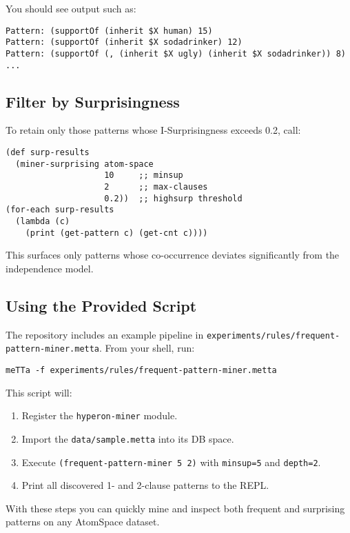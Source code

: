 \documentclass{article}
\begin{document}
You should see output such as:

\begin{verbatim}
Pattern: (supportOf (inherit $X human) 15)
Pattern: (supportOf (inherit $X sodadrinker) 12)
Pattern: (supportOf (, (inherit $X ugly) (inherit $X sodadrinker)) 8)
...
\end{verbatim}

\subsection{Filter by Surprisingness}

To retain only those patterns whose I-Surprisingness exceeds 0.2, call:

\begin{verbatim}
(def surp-results
  (miner-surprising atom-space
                    10     ;; minsup
                    2      ;; max-clauses
                    0.2))  ;; highsurp threshold
(for-each surp-results
  (lambda (c)
    (print (get-pattern c) (get-cnt c))))
\end{verbatim}

This surfaces only patterns whose co-occurrence deviates significantly from the independence model.

\subsection{Using the Provided Script}

The repository includes an example pipeline in \texttt{experiments/rules/frequent-pattern-miner.metta}. From your shell, run:

\begin{verbatim}
meTTa -f experiments/rules/frequent-pattern-miner.metta
\end{verbatim}

This script will:\\

\begin{enumerate}
  \item Register the \texttt{hyperon-miner} module.
  \item Import the \texttt{data/sample.metta} into its DB space.
  \item Execute \texttt{(frequent-pattern-miner 5 2)} with \texttt{minsup=5} and \texttt{depth=2}.
  \item Print all discovered 1- and 2-clause patterns to the REPL.
\end{enumerate}

With these steps you can quickly mine and inspect both frequent and surprising patterns on any AtomSpace dataset.
\end{document}
